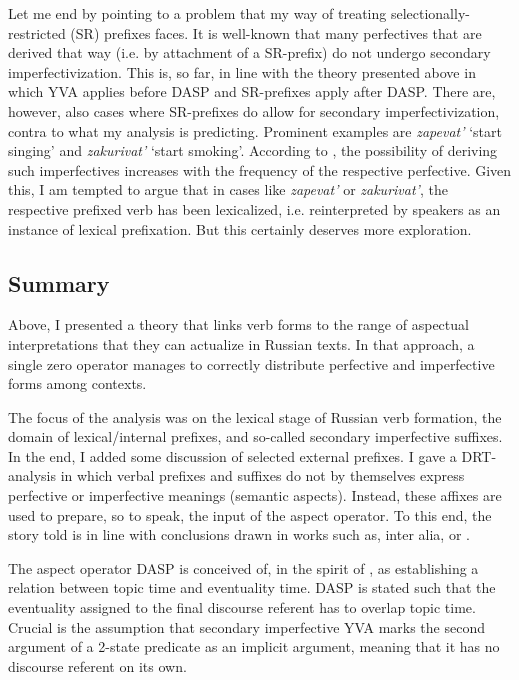 \documentclass[output=paper,colorlinks,citecolor=brown]{langscibook}
\begin{document}
\noindent Let me end by pointing to a problem that my way of treating selectionally-restric\-ted (SR) prefixes faces.  
It is well-known that many perfectives that are derived that way (i.e. by attachment of a SR-prefix)
do not undergo secondary imperfectivization. This is, so far, in line with the theory presented above in which YVA applies before DASP and SR-prefixes apply after DASP. There are, however, also cases where SR-prefixes do allow for secondary imperfectivization, contra to what my analysis is predicting. Prominent examples are \textit{zapevat'} `start singing' and \textit{zakurivat'} `start smoking'. According to \citet{Zaliznjaketal2015}, the possibility of deriving such imperfectives increases with the frequency of the respective perfective. Given this, I am tempted to argue that in cases like \textit{zapevat'} or \textit{zakurivat'}, 
the respective prefixed verb has been lexicalized, i.e. reinterpreted by speakers as an instance of lexical prefixation. But this certainly deserves more exploration.

\subsection{Summary}\label{summo}
Above, I presented a theory that links verb forms to
the range of aspectual interpretations that they can actualize in Russian texts. In that approach, a single zero operator manages to correctly distribute perfective and imperfective forms among contexts.

The focus of the analysis was on the lexical stage of Russian verb formation, the domain of  
lexical/internal prefixes, and so-called secondary imperfective suffixes. In the end, I added some discussion of selected external prefixes. I gave a DRT-analysis in which verbal prefixes and suffixes do not by themselves express perfective or imperfective meanings (semantic aspects). Instead, these affixes are used to prepare, so to speak,
the input of the aspect operator. To this end, the story told is in line with conclusions drawn in works such as, inter alia, \citet{Filip2003} or \citet{Tate17}. 

The aspect operator DASP is conceived of, in the spirit of \citet{Klein1994}, as establishing a relation between topic time and eventuality time.
DASP is stated such that the eventuality assigned to the final discourse referent has to overlap topic time. Crucial is the assumption that secondary imperfective YVA marks the second argument of a 2-state predicate as an implicit argument, meaning that it has no discourse referent on its own. 
\end{document}
